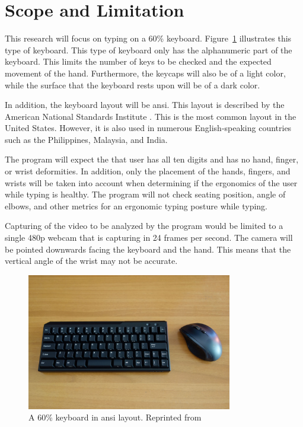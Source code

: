 \documentclass{report}
\begin{document}
\section{Scope and Limitation}
This research will focus on typing on a 60\% keyboard. Figure~\ref{fig:60}
illustrates this type of keyboard. This type of keyboard only has the
alphanumeric part of the keyboard. This limits the number of keys to be checked
and the expected movement of the hand. Furthermore, the keycaps will also be of
a light color, while the surface that the keyboard rests upon will be of a dark
color.

In addition, the keyboard layout will be \ac{ansi}. This layout is described by the
American National Standards Institute \parencite{ansi}. This is the most
common layout in the United States. However, it is also used in numerous
English-speaking countries such as the Philippines, Malaysia, and India.

The program will expect the that user has all ten digits and has no hand,
finger, or wrist deformities. In addition, only the placement of the hands,
fingers, and wrists will be taken into account when determining if the
ergonomics of the user while typing is healthy. The program will not check
seating position, angle of elbows, and other metrics for an ergonomic typing
posture while typing.

Capturing of the video to be analyzed by the program would be limited to a
single 480p webcam that is capturing in 24 frames per second. The camera will
be pointed downwards facing the keyboard and the hand. This means that the
vertical angle of the wrist may not be accurate.

\begin{figure}[H]
	\centering
	\includegraphics[width=0.8\textwidth]{60.jpg}
	\caption{A 60\% keyboard in \ac{ansi} layout. Reprinted from }
	\label{fig:60}
	\centering
\end{figure}
\end{document}
